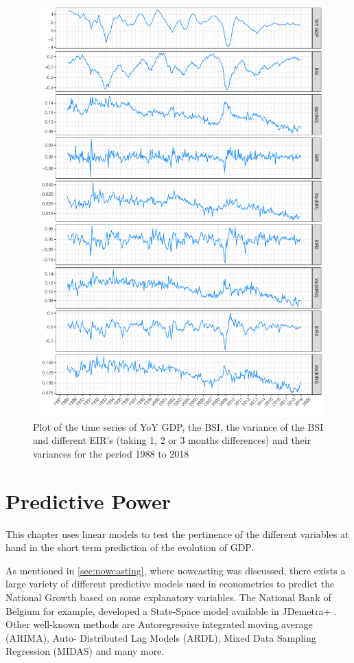 \documentclass[12pt,a4paper,oneside]{book}
\begin{document}
\begin{figure}[!htbp]
    \centering
    \includegraphics[scale=0.7]{Graphs/variables.pdf}
    \caption{Plot of the time series of YoY GDP, the BSI, the variance of the BSI and different EIR's (taking 1, 2 or 3 months differences) and their variances
    for the period 1988 to 2018}
    \label{plot:variables}
\end{figure}



\chapter{Predictive Power}

This chapter uses linear models to test the pertinence of the different variables at hand in the short term prediction of the evolution of GDP.

As mentioned in \autoref{sec:nowcasting}, where nowcasting was discussed, there exists a large variety of different predictive models used in econometrics to predict the National Growth based on some explanatory variables.
The National Bank of Belgium for example, developed a State-Space model available in JDemetra+ \citep{de_antonio_liedo_nowcasting_2014}. 
Other well-known methods are Autoregressive integrated moving average (ARIMA), Auto- Distributed Lag Models (ARDL), Mixed Data Sampling Regression (MIDAS) and many more.
\end{document}
